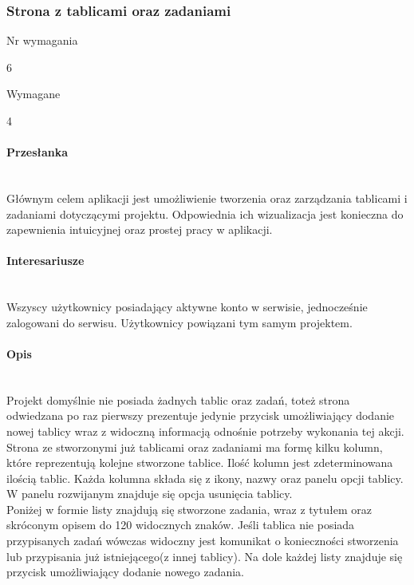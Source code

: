 \documentclass[eng,printmode]{mgr}
\begin{document}
\subsubsection{Strona z tablicami oraz zadaniami}
\begin{labeling}{Nr wymagania}
\item [Nr wymagania:] 6
\item [Typ:] Wymagane
\item [Powiązania:] 4
\end{labeling}

\paragraph{Przesłanka}\ \\
Głównym celem aplikacji jest umożliwienie tworzenia oraz zarządzania tablicami i zadaniami dotyczącymi projektu. Odpowiednia ich wizualizacja jest konieczna do zapewnienia intuicyjnej oraz prostej pracy w aplikacji.

\paragraph{Interesariusze}\ \\
Wszyscy użytkownicy posiadający aktywne konto w serwisie, jednocześnie zalogowani do serwisu. Użytkownicy powiązani tym samym projektem.

\paragraph{Opis}\ \\
Projekt domyślnie nie posiada żadnych tablic oraz zadań, toteż strona odwiedzana po raz pierwszy prezentuje jedynie przycisk umożliwiający dodanie nowej tablicy wraz z widoczną informacją odnośnie potrzeby wykonania tej akcji. \\
Strona ze stworzonymi już tablicami oraz zadaniami ma formę kilku kolumn, które reprezentują kolejne stworzone tablice. Ilość kolumn jest zdeterminowana ilością tablic. Każda kolumna składa się z ikony, nazwy oraz panelu opcji tablicy. W panelu rozwijanym znajduje się opcja usunięcia tablicy. \\
Poniżej w formie listy znajdują się stworzone zadania, wraz z tytułem oraz skróconym opisem do 120 widocznych znaków. Jeśli tablica nie posiada przypisanych zadań wówczas widoczny jest komunikat o konieczności stworzenia lub przypisania już istniejącego(z innej tablicy). Na dole każdej listy znajduje się przycisk umożliwiający dodanie nowego zadania.
\newpage
\end{document}
